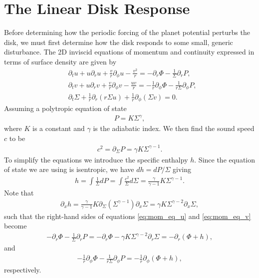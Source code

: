 \section{The Linear Disk Response}

Before determining how the periodic forcing of the planet potential perturbs the disk, we must first determine how the disk responds to some small, generic disturbance.
The 2D inviscid equations of momentum and continuity expressed in terms of surface density are given by \citep{landau1959}
\begin{align}
    &\partial_t u + u \partial_r u + \frac{v}{r} \partial_\phi u - \frac{v^2}{r} = - \partial_r \Phi - \frac{1}{\Sigma} \partial_r P, \label{eq:mom_eq_u} \\ 
    &\partial_t v + u \partial_r v + \frac{v}{r} \partial_\phi v - \frac{uv}{r} = - \frac{1}{r} \partial_\phi \Phi - \frac{1}{r\Sigma} \partial_\phi P, \label{eq:mom_eq_v} \\
    &\partial_t \Sigma + \frac{1}{r} \partial_r (r \Sigma u) + \frac{1}{r} \partial_\phi (\Sigma v) = 0. 
    \label{eq:cont_2d}
\end{align}
Assuming a polytropic equation of state
\begin{align}
    P = K \Sigma^\gamma,
\end{align}
where $K$ is a constant and $\gamma$ is the adiabatic index. We then find the sound speed $c$ to be
\begin{align}
    c^2 = \partial_\Sigma P = \gamma K \Sigma^{\gamma-1}. \label{eq:cs_poly}
\end{align}
To simplify the equations we introduce the specific enthalpy $h$. Since the equation of state we are using is isentropic, we have $dh = dP / \Sigma$ giving
\begin{align}
    h = \int \frac{1}{\Sigma} dP = \int \frac{c^2}{\Sigma} d\Sigma = \frac{\gamma}{\gamma-1} K \Sigma^{\gamma-1}. \label{eq:enthalpy}
\end{align}
Note that
\begin{align}
    \partial_x h = \frac{\gamma}{\gamma - 1} K \partial_\Sigma (\Sigma^{\gamma-1}) \partial_x \Sigma = \gamma K \Sigma^{\gamma-2} \partial_x \Sigma,
\end{align}
such that the right-hand sides of equations \ref{eq:mom_eq_u} and \ref{eq:mom_eq_v} become
\begin{align}
    - \partial_r \Phi - \frac{1}{\Sigma} \partial_r P = - \partial_r \Phi - \gamma K \Sigma^{\gamma-2} \partial_r \Sigma = - \partial_r (\Phi + h) \label{eq:mom_u_RHS},
\end{align}
and
\begin{align}
    - \frac{1}{r} \partial_\phi \Phi - \frac{1}{r\Sigma} \partial_\phi P = - \frac{1}{r} \partial_\phi (\Phi + h) \label{eq:mom_v_RHS},
\end{align}
respectively.


